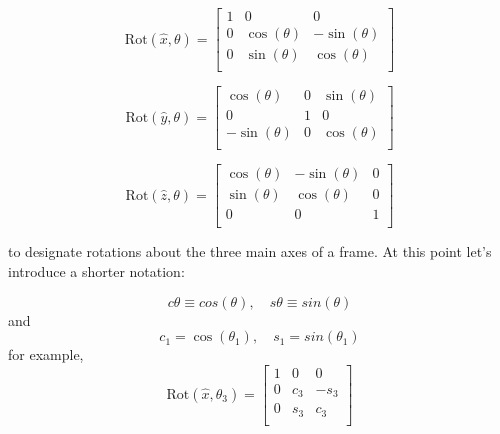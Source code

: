 \[
\mathrm{Rot}(\hat{x}, \theta) =  \left[
\begin{array}{ccc}
1  &     0        &      0    \\
0  &  \cos(\theta) & -\sin(\theta) \\
0  &  \sin(\theta) &  \cos(\theta) \\
\end{array} \right]
\]

\[
\mathrm{Rot}(\hat{y}, \theta) =  \left[
\begin{array}{ccc}
\cos(\theta)  &       0      & \sin(\theta) \\
     0       &       1      &     0       \\
-\sin(\theta) &       0      & \cos(\theta) \\
\end{array}\right]
\]

\[
\mathrm{Rot}(\hat{z}, \theta) =  \left[
\begin{array}{ccc}
\cos(\theta) & -\sin(\theta) & 0 \\
\sin(\theta) &  \cos(\theta) & 0 \\
0           &          0   & 1 \\
\end{array}\right]
\]



to designate rotations about the three main axes of a frame.   At this point let's introduce a shorter notation:

\[
c\theta \equiv cos(\theta), \quad s\theta \equiv sin(\theta)
\]
and
\[
c_1 = \cos(\theta_1), \quad s_1 = sin(\theta_1)
\]
for example,
\[
\mathrm{Rot}(\hat{x}, \theta_3) =
\left[
\begin{array}{ccc}
1  &  0  &  0    \\
0  & c_3 & -s_3  \\
0  & s_3 &  c_3  \\
\end{array}\right]
\]


